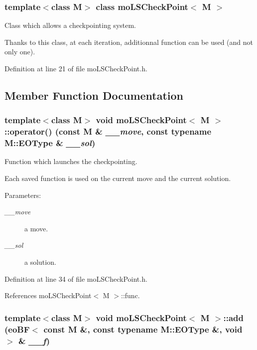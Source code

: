 \subsubsection*{template$<$class M$>$ class mo\-LSCheck\-Point$<$ M $>$}

Class which allows a checkpointing system. 

Thanks to this class, at each iteration, additionnal function can be used (and not only one). 



Definition at line 21 of file mo\-LSCheck\-Point.h.

\subsection{Member Function Documentation}
\subsubsection{\setlength{\rightskip}{0pt plus 5cm}template$<$class M$>$ void {\bf mo\-LSCheck\-Point}$<$ M $>$::operator() (const M \& {\em \_\-\_\-move}, const typename M::EOType \& {\em \_\-\_\-sol})\hspace{0.3cm}{\tt  [inline]}}\label{classmo_l_s_check_point_2f9c1250279e3f49ec77a66c10029f1e}


Function which launches the checkpointing. 

Each saved function is used on the current move and the current solution.

\begin{Desc}
\item[Parameters:]
\begin{description}
\item[{\em \_\-\_\-move}]a move. \item[{\em \_\-\_\-sol}]a solution. \end{description}
\end{Desc}


Definition at line 34 of file mo\-LSCheck\-Point.h.

References mo\-LSCheck\-Point$<$ M $>$::func.
\subsubsection{\setlength{\rightskip}{0pt plus 5cm}template$<$class M$>$ void {\bf mo\-LSCheck\-Point}$<$ M $>$::add (eo\-BF$<$ const M \&, const typename M::EOType \&, void $>$ \& {\em \_\-\_\-f})\hspace{0.3cm}{\tt  [inline]}}\label{classmo_l_s_check_point_66be5fe2944bcdd752f1e58105e969a6}


